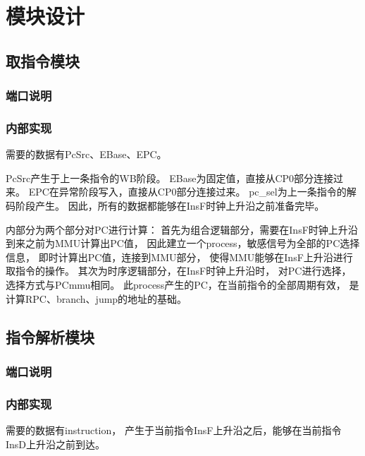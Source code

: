 \section{模块设计}
    \subsection{取指令模块}
        \subsubsection{端口说明}
             
        \subsubsection{内部实现}
            需要的数据有PcSrc、EBase、EPC。

            PcSrc产生于上一条指令的WB阶段。%
            EBase为固定值，直接从CP0部分连接过来。%
            EPC在异常阶段写入，直接从CP0部分连接过来。%
            pc\_sel为上一条指令的解码阶段产生。%
            因此，所有的数据都能够在InsF时钟上升沿之前准备完毕。

            内部分为两个部分对PC进行计算：%
            首先为组合逻辑部分，需要在InsF时钟上升沿到来之前为MMU计算出PC值，%
            因此建立一个process，敏感信号为全部的PC选择信息，%
            即时计算出PC值，连接到MMU部分，%
            使得MMU能够在InsF上升沿进行取指令的操作。%
            其次为时序逻辑部分，在InsF时钟上升沿时，%
            对PC进行选择，选择方式与PCmmu相同。%
            此process产生的PC，在当前指令的全部周期有效，%
            是计算RPC、branch、jump的地址的基础。%
    \subsection{指令解析模块}
        \subsubsection{端口说明}
            
        \subsubsection{内部实现}
            需要的数据有instruction，%
            产生于当前指令InsF上升沿之后，能够在当前指令InsD上升沿之前到达。

